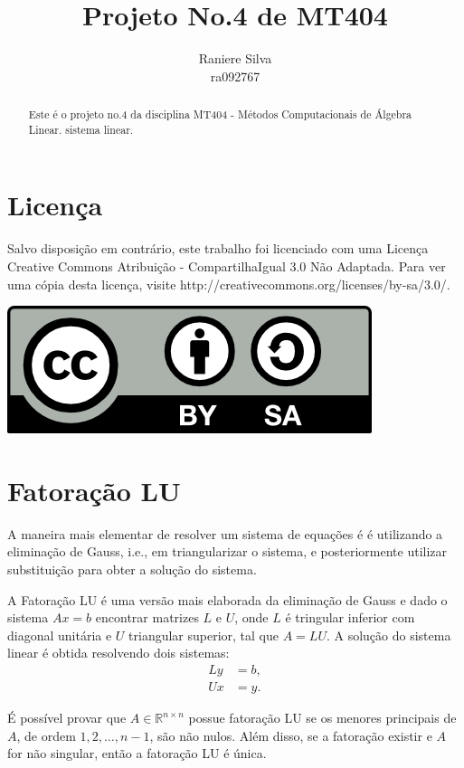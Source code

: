 \documentclass[12pt,a4paper]{article}
\begin{document}
\title{Projeto No.4 de MT404}
\author{Raniere Silva \\ ra092767}
\maketitle
\begin{abstract}
    Este \'{e} o projeto no.4 da disciplina MT404 - M\'{e}todos Computacionais
    de \'{A}lgebra Linear.
    sistema linear.
\end{abstract}
\tableofcontents
\lstlistoflistings
\section*{Licen\c{c}a}
Salvo disposi\c{c}\~{a}o em contr\'{a}rio, este trabalho foi licenciado com uma
Licen\c{c}a Creative Commons Atribui\c{c}\~{a}o - CompartilhaIgual 3.0 N\~{a}o
Adaptada. Para ver uma c\'{o}pia desta licen\c{c}a, visite
http://creativecommons.org/licenses/by-sa/3.0/.
\begin{center}
    \includegraphics{../figuras/cc-by-sa.png}
\end{center}
\newpage
\section{Fatora\c{c}\~{a}o LU}
A maneira mais elementar de resolver um sistema de equa\c{c}\~{o}es \'{e} \'{e}
utilizando a elimina\c{c}\~{a}o de Gauss, i.e., em triangularizar o
sistema, e posteriormente utilizar substitui\c{c}\~{a}o para obter a
solu\c{c}\~{a}o do sistema.

A Fatora\c{c}\~{a}o LU \'{e} uma vers\~{a}o mais elaborada da elimina\c{c}\~{a}o
de Gauss e dado o sistema $A x = b$ encontrar matrizes $L$ e $U$, onde $L$ \'{e}
tringular inferior com diagonal unit\'{a}ria e $U$ triangular superior, tal que
$A = L U$. A solu\c{c}\~{a}o do sistema linear \'{e} obtida resolvendo dois
sistemas:
\begin{align*}
    L y &= b, \\
    U x &= y.
\end{align*}

\'{E} poss\'{i}vel provar que $A \in \mathbb{R}^{n \times n}$ possue
fatora\c{c}\~{a}o LU se os menores principais de $A$, de ordem $1, 2, \ldots, n
- 1$, s\~{a}o n\~{a}o nulos. Al\'{e}m disso, se a fatora\c{c}\~{a}o existir e
$A$ for n\~{a}o singular, ent\~{a}o a fatora\c{c}\~{a}o LU \'{e} \'{u}nica.
\end{document}
